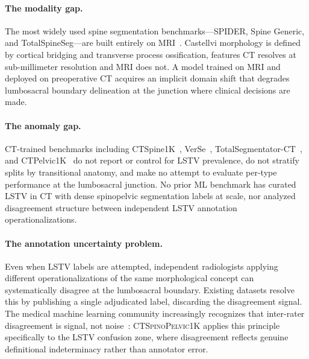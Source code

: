 \documentclass[pmlr]{jmlr}
\newcommand{\dataset}{\textsc{CTSpinoPelvic1K}}
\begin{document}
\paragraph{The modality gap.}
The most widely used spine segmentation benchmarks---SPIDER,
Spine Generic, and TotalSpineSeg---are built entirely on
MRI~\citep{GraafSPIDERBenchmark,Cohen-Adad2021Open-accessManufacturers,Warszawer2025TotalSpineSeg:MRI}.
Castellvi morphology is defined by cortical bridging and transverse
process ossification, features CT resolves at sub-millimeter
resolution and MRI does not.
A model trained on MRI and deployed on preoperative CT acquires an
implicit domain shift that degrades lumbosacral boundary delineation
at the junction where clinical decisions are made.

\paragraph{The anomaly gap.}
CT-trained benchmarks including
CTSpine1K~\citep{Deng2021CTSpine1K:Tomography},
VerSe~\citep{Sekuboyina2020VerSe:Benchmark},
TotalSegmentator-CT~\citep{Wasserthal2023TotalSegmentator:Images}, and
CTPelvic1K~\citep{Liu2021DeepModels} do not report or control for
LSTV prevalence, do not stratify splits by transitional anatomy,
and make no attempt to evaluate per-type performance at the
lumbosacral junction.
No prior ML benchmark has curated LSTV in CT with dense spinopelvic
segmentation labels at scale, nor analyzed disagreement structure
between independent LSTV annotation operationalizations.

\paragraph{The annotation uncertainty problem.}
Even when LSTV labels are attempted, independent radiologists
applying different operationalizations of the same morphological
concept can systematically disagree at the lumbosacral boundary.
Existing datasets resolve this by publishing a single adjudicated
label, discarding the disagreement signal.
The medical machine learning community increasingly recognizes
that inter-rater disagreement is signal, not
noise~\citep{Dawid1979MaximumAlgorithm}:
\dataset{} applies this principle specifically to the LSTV
confusion zone, where disagreement reflects genuine definitional
indeterminacy rather than annotator error.
\end{document}

